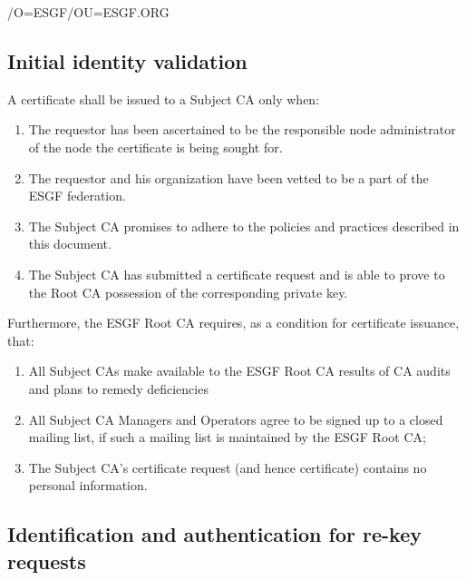/O=ESGF/OU=ESGF.ORG

\subsection{Initial identity validation}\label{initial-identity-validation}

A certificate shall be issued to a Subject CA only when:

\begin{enumerate}
\item
  
  The requestor has been ascertained to be the responsible node administrator of the node the certificate is being sought for.
  
\item
 The requestor and his organization have been vetted to be a part of the ESGF federation.
 
\item  
  The Subject CA promises to adhere to the policies and practices described in this document.
  
\item
  
  The Subject CA has submitted a certificate request and is able to
  prove to the Root CA possession of the corresponding private key.
  
\end{enumerate}

Furthermore, the ESGF Root CA requires, as a condition for
certificate issuance, that:

\begin{enumerate}
\item
  
  All Subject CAs make available to the ESGF Root CA results of CA
  audits and plans to remedy deficiencies
  
\item
  
  All Subject CA Managers and Operators agree to be signed up to a
  closed mailing list, if such a mailing list is maintained by the ESGF Root CA;
  
\item
  
  The Subject CA's certificate request (and hence certificate) contains
  no personal information.
  
\end{enumerate}

\subsection{Identification and authentication for re-key requests}\label{identification-and-authentication-for-re-key-requests}

